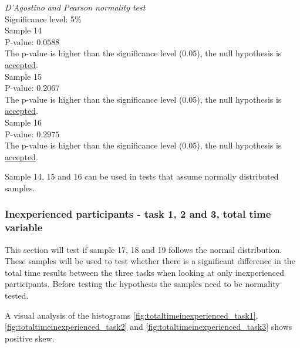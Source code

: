   \begin{center}
	\begin{tcolorbox}[width=0.80\textwidth]
		\centering
		\textit{D'Agostino and Pearson normality test}\\
		Significance level: 5\%  \\[0.5cm]
		
		Sample 14 \\
		P-value: $0.0588$\\
		The p-value is higher than the significance level (0.05), the null hypothesis is \underline{accepted}.\\[0.5cm]
		
		Sample 15 \\
		P-value: $0.2067$ \\
		The p-value is higher than the significance level (0.05), the null hypothesis is \underline{accepted}.\\[0.5cm]
		
		Sample 16 \\
		P-value: $0.2975$ \\
		The p-value is higher than the significance level (0.05), the null hypothesis is \underline{accepted}.\\[0.5cm]
	\end{tcolorbox}
\end{center}
\vspace{0.3cm}

Sample 14, 15 and 16 can be used in tests that assume normally distributed samples.

\subsubsection[Sample 17, 18 and 19]{Inexperienced participants - task 1, 2 and 3, total time variable}\label{sec:sample_17,18,19_normalitytest}
This section will test if sample 17, 18 and 19 follows the normal distribution. These samples will be used to test whether there is a significant difference in the total time results between the three tasks when looking at only inexperienced participants. Before testing the hypothesis the samples need to be normality tested. 

A visual analysis of the histograms \ref{fig:totaltimeinexperienced_task1}, \ref{fig:totaltimeinexperienced_task2} and \ref{fig:totaltimeinexperienced_task3} shows positive skew. 

